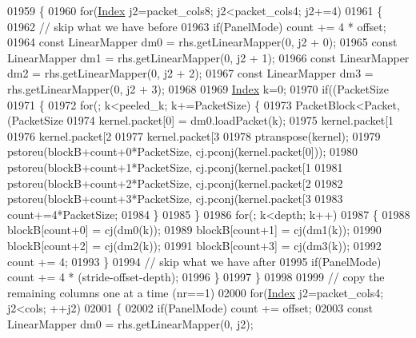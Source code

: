 \begin{DoxyCode}
01959   \{
01960     \textcolor{keywordflow}{for}(\hyperlink{namespace_eigen_a62e77e0933482dafde8fe197d9a2cfde}{Index} j2=packet\_cols8; j2<packet\_cols4; j2+=4)
01961     \{
01962       \textcolor{comment}{// skip what we have before}
01963       \textcolor{keywordflow}{if}(PanelMode) count += 4 * offset;
01964       \textcolor{keyword}{const} LinearMapper dm0 = rhs.getLinearMapper(0, j2 + 0);
01965       \textcolor{keyword}{const} LinearMapper dm1 = rhs.getLinearMapper(0, j2 + 1);
01966       \textcolor{keyword}{const} LinearMapper dm2 = rhs.getLinearMapper(0, j2 + 2);
01967       \textcolor{keyword}{const} LinearMapper dm3 = rhs.getLinearMapper(0, j2 + 3);
01968 
01969       \hyperlink{namespace_eigen_a62e77e0933482dafde8fe197d9a2cfde}{Index} k=0;
01970       \textcolor{keywordflow}{if}((PacketSize%
01971       \{
01972         \textcolor{keywordflow}{for}(; k<peeled\_k; k+=PacketSize) \{
01973           PacketBlock<Packet,(PacketSize%
01974           kernel.packet[0] = dm0.loadPacket(k);
01975           kernel.packet[1%
01976           kernel.packet[2%
01977           kernel.packet[3%
01978           ptranspose(kernel);
01979           pstoreu(blockB+count+0*PacketSize, cj.pconj(kernel.packet[0]));
01980           pstoreu(blockB+count+1*PacketSize, cj.pconj(kernel.packet[1%
01981           pstoreu(blockB+count+2*PacketSize, cj.pconj(kernel.packet[2%
01982           pstoreu(blockB+count+3*PacketSize, cj.pconj(kernel.packet[3%
01983           count+=4*PacketSize;
01984         \}
01985       \}
01986       \textcolor{keywordflow}{for}(; k<depth; k++)
01987       \{
01988         blockB[count+0] = cj(dm0(k));
01989         blockB[count+1] = cj(dm1(k));
01990         blockB[count+2] = cj(dm2(k));
01991         blockB[count+3] = cj(dm3(k));
01992         count += 4;
01993       \}
01994       \textcolor{comment}{// skip what we have after}
01995       \textcolor{keywordflow}{if}(PanelMode) count += 4 * (stride-offset-depth);
01996     \}
01997   \}
01998 
01999   \textcolor{comment}{// copy the remaining columns one at a time (nr==1)}
02000   \textcolor{keywordflow}{for}(\hyperlink{namespace_eigen_a62e77e0933482dafde8fe197d9a2cfde}{Index} j2=packet\_cols4; j2<cols; ++j2)
02001   \{
02002     \textcolor{keywordflow}{if}(PanelMode) count += offset;
02003     \textcolor{keyword}{const} LinearMapper dm0 = rhs.getLinearMapper(0, j2);

\end{DoxyCode}
